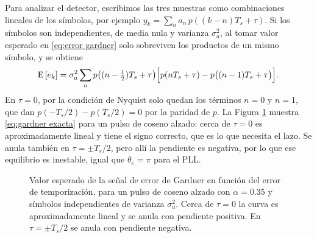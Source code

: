 Para analizar el detector, escribimos las tres muestras como combinaciones lineales de los símbolos, por ejemplo $y_k=\sum_n a_n\,p((k-n)T_s+\tau)$. Si los símbolos son independientes, de media nula y varianza $\sigma_a^2$, al tomar valor esperado en \eqref{eq:error gardner} solo sobreviven los productos de un mismo símbolo, y se obtiene
\begin{equation}\label{eq:gardner exacta}
    \mathrm{E}\left[e_k\right] = \sigma_a^2\sum_{n} p\big((n-\tfrac12)T_s+\tau\big)\Big[p(nT_s+\tau) - p\big((n-1)T_s+\tau\big)\Big].
\end{equation}
En $\tau=0$, por la condición de Nyquist solo quedan los términos $n=0$ y $n=1$, que dan $p(-T_s/2)-p(T_s/2)=0$ por la paridad de $p$. La Figura \ref{fig:gardner curva} muestra \eqref{eq:gardner exacta} para un pulso de coseno alzado: cerca de $\tau=0$ es aproximadamente lineal y tiene el signo correcto, que es lo que necesita el lazo. Se anula también en $\tau=\pm T_s/2$, pero allí la pendiente es negativa, por lo que ese equilibrio es inestable, igual que $\theta_e=\pi$ para el PLL.

\begin{figure}
    \begin{center}
    \end{center}
    \caption{Valor esperado de la señal de error de Gardner en función del error de temporización, para un pulso de coseno alzado con $\alpha=0.35$ y símbolos independientes de varianza $\sigma_a^2$. Cerca de $\tau=0$ la curva es aproximadamente lineal y se anula con pendiente positiva. En $\tau=\pm T_s/2$ se anula con pendiente negativa.}\label{fig:gardner curva}
\end{figure}

